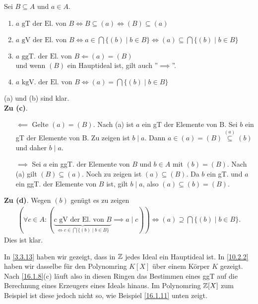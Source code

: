 \documentclass[../../main.tex]{subfiles}
\begin{document}
\begin{pro}\label{16.1.8}
Sei $B\subseteq A$ und $a\in A$.
\begin{enumerate}[\normalfont(a)]
\item $a\text{ gT der El. von }B\Longleftrightarrow B\subseteq (a)\Longleftrightarrow(B)\subseteq (a)$
\item $a\text{ gV der El. von }B\Longleftrightarrow a\in\bigcap\{(b)\mid b\in B\}\Longleftrightarrow (a)\subseteq\bigcap\{(b)\mid b\in B\}$
\item $a\text{ ggT. der El. von }B\Longleftarrow (a)=(B)$\\
und wenn $(B)$ ein Hauptideal ist, gilt auch ''$\implies$''.
\item $a\text{ kgV. der El. von }B\Longleftrightarrow (a)=\bigcap\{(b)\mid b\in B\}$
\end{enumerate}
\end{pro}
\begin{cproof}
(a) und (b) sind klar.\\

\noindent\textbf{Zu (c)}. 
\begin{itemize}
\item[$\impliedby$] Gelte $(a)=(B)$. Nach (a) ist $a$ ein gT der Elemente von B. Sei $b$ ein gT der Elemente von B. Zu zeigen ist $b\mid a$. Dann $a\in (a)=(B)\stackrel{(a)}{\subseteq}(b)$ und daher $b\mid a$.
\item[$\implies$] Sei $a$ ein ggT. der Elemente von $B$ und $b\in A$ mit $(b)=(B)$. Nach (a) gilt $(B)\subseteq (a)$. Noch zu zeigen ist $(a)\subseteq (B)$. Da $b$ ein gT. und $a$ ein ggT. der Elemente von $B$ ist, gilt $b\mid a$, also $(a)\subseteq (b)=(B)$.\\
\end{itemize}
\noindent\textbf{Zu (d)}. Wegen $(b)$ genügt es zu zeigen
\begin{align*}
	(\forall c\in A:(\underbrace{c\text{ gV der El. von }B}_{\Longleftrightarrow c\in \bigcap\{(b)\mid b\in B\}}\implies a\mid c))\Longleftrightarrow (a)\supseteq\bigcap\{(b)\mid b\in B\}.
\end{align*}
Dies ist klar.
\end{cproof}

\begin{bem}\label{16.1.9}
In \ref{3.3.13} haben wir gezeigt, dass in $\mathbb Z$ jedes Ideal ein Hauptideal ist. In \ref{10.2.2} haben wir dasselbe für den Polynomring $K[X]$ über einem Körper $K$ gezeigt. Nach \ref{16.1.8}(c) läuft also in diesen Ringen das Bestimmen eines ggT auf die Berechnung eines Erzeugers eines Ideals hinaus. Im Polynomring $\mathbb Z[X]$ zum Beispiel ist diese jedoch nicht so, wie Beispiel \ref{16.1.11} unten zeigt.
\end{bem}
\end{document}
